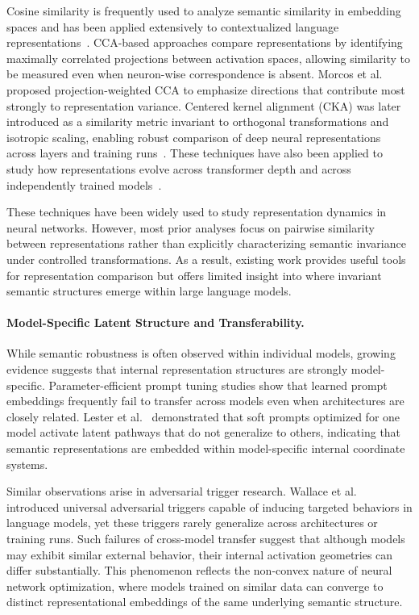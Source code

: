 Cosine similarity is frequently used to analyze semantic similarity in embedding spaces and has been applied extensively to contextualized language representations~\cite{ethayarajh-2019-contextual,bommasani-etal-2020-interpreting}. CCA-based approaches compare representations by identifying maximally correlated projections between activation spaces, allowing similarity to be measured even when neuron-wise correspondence is absent. Morcos et al.~\cite{morcos2018pwcca} proposed projection-weighted CCA to emphasize directions that contribute most strongly to representation variance. Centered kernel alignment (CKA) was later introduced as a similarity metric invariant to orthogonal transformations and isotropic scaling, enabling robust comparison of deep neural representations across layers and training runs~\cite{kornblith2019similarity}. These techniques have also been applied to study how representations evolve across transformer depth and across independently trained models~\cite{reif2019visualizing}.

These techniques have been widely used to study representation dynamics in neural networks. However, most prior analyses focus on pairwise similarity between representations rather than explicitly characterizing semantic invariance under controlled transformations. As a result, existing work provides useful tools for representation comparison but offers limited insight into where invariant semantic structures emerge within large language models.

\vspace{-1.0em}
\paragraph{Model-Specific Latent Structure and Transferability.} 
While semantic robustness is often observed within individual models, growing evidence suggests that internal representation structures are strongly model-specific. Parameter-efficient prompt tuning studies show that learned prompt embeddings frequently fail to transfer across models even when architectures are closely related. Lester et al.~\cite{lester-etal-2021-power} demonstrated that soft prompts optimized for one model activate latent pathways that do not generalize to others, indicating that semantic representations are embedded within model-specific internal coordinate systems.

Similar observations arise in adversarial trigger research. Wallace et al.~\cite{wallace-etal-2019-universal} introduced universal adversarial triggers capable of inducing targeted behaviors in language models, yet these triggers rarely generalize across architectures or training runs. Such failures of cross-model transfer suggest that although models may exhibit similar external behavior, their internal activation geometries can differ substantially. This phenomenon reflects the non-convex nature of neural network optimization, where models trained on similar data can converge to distinct representational embeddings of the same underlying semantic structure.

